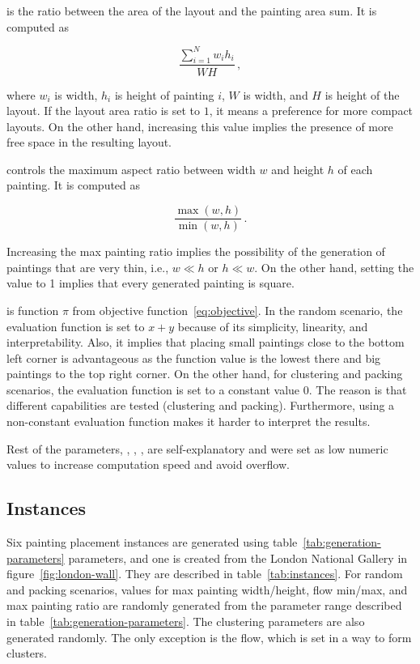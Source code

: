  is the ratio between the area of the layout and the painting area sum.
It is computed as

\[
    \dfrac{\sum\limits_{i=1}^{N} w_i h_i}{WH}\,,
\]

where $w_i$ is width, $h_i$ is height of painting $i$, $W$ is width, and $H$ is height of the layout.
If the layout area ratio is set to $1$, it means a preference for more compact layouts.
On the other hand,
increasing this value implies the presence of more free space in the resulting layout.

 controls the maximum aspect ratio between width $w$ and height $h$ of each painting.
It is computed as

\[
    \dfrac{\max(w,h)}{\min(w,h)}\,.
\]

Increasing the max painting ratio implies the possibility of the generation of paintings
that are very thin, i.e., $w \ll h$ or $h \ll w$.
On the other hand, setting the value to 1
implies that every generated painting is square.

 is function $\pi$ from objective function~\ref{eq:objective}.
In the random scenario, the evaluation function is set to $x+y$ because of its simplicity, linearity, and interpretability.
Also, it implies that placing small paintings close to the bottom left corner is advantageous as the function value is the lowest there and
big paintings to the top right corner.
On the other hand, for clustering and packing scenarios, the evaluation function is set to a constant value $0$.
The reason is that different capabilities are tested (clustering and packing).
Furthermore, using a non-constant evaluation function makes it harder to interpret the results.

Rest of the parameters, , , , 
are self-explanatory and were set as low numeric values to increase computation speed and avoid overflow.

\subsection{Instances}\label{subsec:instances}

Six painting placement instances are generated using table~\ref{tab:generation-parameters} parameters, and one is created from the London National Gallery in figure~\ref{fig:london-wall}.
They are described in table~\ref{tab:instances}.
For random and packing scenarios, values for max painting width/height, flow min/max, and max painting ratio are randomly generated from the parameter range described in table~\ref{tab:generation-parameters}.
The clustering parameters are also generated randomly.
The only exception is the flow, which is set in a way to form clusters.

